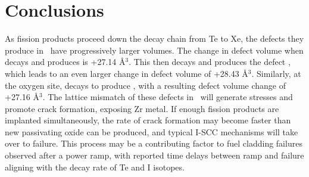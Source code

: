 \section{Conclusions}

As fission products proceed down the decay chain from Te to Xe, the defects they produce in \zirconia\ have progressively larger volumes. The change in defect volume when  decays and produces  is +27.14 \r{A}$^{3}$. This then decays and produces the defect , which leads to an even larger change in defect volume of +28.43 \r{A}$^{3}$. Similarly, at the oxygen site,  decays to produce , with a resulting defect volume change of +27.16 \r{A}$^{3}$. The lattice mismatch of these defects in \zirconia\ will generate stresses and promote crack formation, exposing Zr metal. If enough fission products are implanted simultaneously, the rate of crack formation may become faster than new passivating oxide can be produced, and typical I-SCC mechanisms will take over to failure. This process may be a contributing factor to fuel cladding failures observed after a power ramp, with reported time delays between ramp and failure aligning with the decay rate of Te and I isotopes. 






